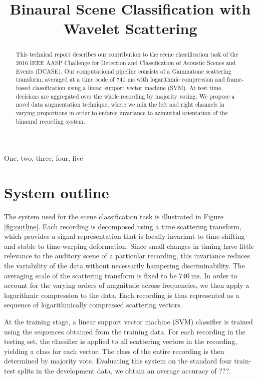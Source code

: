\documentclass{article}
\title{Binaural Scene Classification with Wavelet Scattering}
\begin{document}
\ninept
\maketitle

\begin{sloppy}

\begin{abstract}
This technical report describes our contribution to the scene classification task of the 2016 IEEE AASP Challenge for Detection and Classification of Acoustic Scenes and Events (DCASE). Our computational pipeline consists of a Gammatone scattering transform, averaged at a time scale of 740 ms with logarithmic compression and frame-based classification using a linear support vector machine (SVM). At test time, decisions are aggregated over the whole recording by majority voting. We propose a novel data augmentation technique, where we mix the left and right channels in varying proportions in order to enforce invariance to azimuthal orientation of the binaural recording system.
\end{abstract}

\begin{keywords}
One, two, three, four, five
\end{keywords}

\section{System outline}
The system used for the scene classification task is illustrated in Figure \ref{fig:outline}. Each recording is decomposed using a time scattering transform, which provides a signal representation that is locally invariant to time-shifting and stable to time-warping deformation. Since small changes in timing have little relevance to the auditory scene of a particular recording, this invariance reduces the variability of the data without necessarily hampering discriminability. The averaging scale of the scattering transform is fixed to be $740~\mathrm{ms}$. In order to account for the varying orders of magnitude across frequencies, we then apply a logarithmic compression to the data. Each recording is thus represented as a sequence of logarithmically compressed scattering vectors.

At the training stage, a linear support vector machine (SVM) classifier is trained using the sequences obtained from the training data. For each recording in the testing set, the classifier is applied to all scattering vectors in the recording, yielding a class for each vector. The class of the entire recording is then determined by majority vote. Evaluating this system on the standard four train-test splits in the development data, we obtain an average accuracy of ???.


\end{sloppy}
\end{document}
